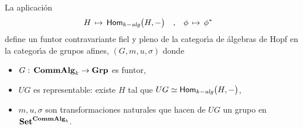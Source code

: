 \begin{teoEquivalencia}\label{thm:equivalencia}
	La aplicaci\'{o}n
	\begin{align*}
		H\,\mapsto\,\Homalg\big(H,-\big) &\quad\text{,}\quad
			\phi\,\mapsto\,\pull\phi
	\end{align*}
	define un funtor contravariante fiel y pleno de la categor\'{\i}a de
	\'{a}lgebras de Hopf en la categor\'{\i}a de grupos afines,
	$(G,m,u,\sigma)$ donde
	\begin{itemize}
		\item $G:\,\CommAlg[k]\rightarrow\Grp$ es funtor,
		\item $UG$ es representable: existe $H$ tal que
			$UG\simeq\Homalg\big(H,-\big)$,
		\item $m,u,\sigma$ son transformaciones naturales que hacen de
			$UG$ un grupo en $\Set^{\CommAlg[k]}$.
	\end{itemize}
\end{teoEquivalencia}

